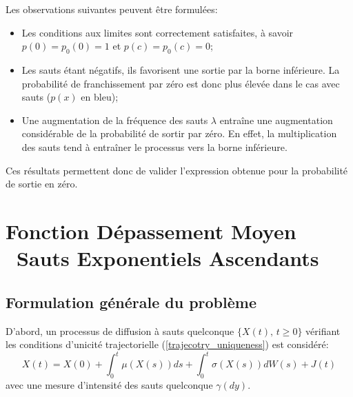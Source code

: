 Les observations suivantes peuvent être formulées:
\begin{itemize}
    \item Les conditions aux limites sont correctement satisfaites, à savoir \( p(0) = p_0(0) = 1 \) et \( p(c) = p_0(c) = 0 \);
    \item Les sauts étant négatifs, ils favorisent une sortie par la borne inférieure. La probabilité de franchissement par zéro est donc plus élevée dans le cas avec sauts ($p(x)$ en bleu);
    \item Une augmentation de la fréquence des sauts $\lambda$ entraîne une augmentation considérable de la probabilité de sortir par zéro. En effet, la multiplication des sauts tend à entraîner le processus vers la borne inférieure.
\end{itemize}
Ces résultats permettent donc de valider l'expression obtenue pour la probabilité de sortie en zéro.

\section{Fonction Dépassement Moyen \textemdash~Sauts Exponentiels Ascendants}
\subsection{Formulation générale du problème}
D'abord, un processus de diffusion à sauts quelconque \(\{X(t),\,t\geq0\}\) vérifiant les conditions d'unicité trajectorielle (\ref{trajecotry_uniqueness}) est considéré:
\[
X(t)=X(0)+\int_0^t \mu(X(s))ds+\int_0^t\sigma(X(s))dW(s)+J(t)
\]
avec une mesure d'intensité des sauts quelconque $\gamma(dy)$.

